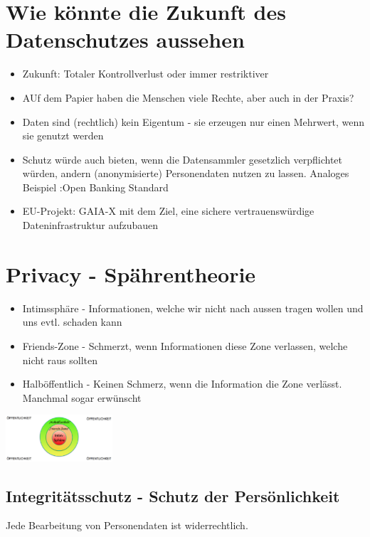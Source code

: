 \documentclass{report}
\newenvironment{Figure}
	{\par\medskip\noindent\minipage{\linewidth}}
	{\endminipage\par\medskip}
\theoremstyle{definition}
\theoremstyle{example}
\begin{document}
\section{Wie könnte die Zukunft des Datenschutzes aussehen}
\begin{itemize}
   \item Zukunft: Totaler Kontrollverlust oder immer restriktiver
   \item AUf dem Papier haben die Menschen viele Rechte, aber auch in der Praxis?
   \item Daten sind (rechtlich) kein Eigentum - sie erzeugen nur einen Mehrwert, wenn sie genutzt werden
   \item Schutz würde auch bieten, wenn die Datensammler gesetzlich verpflichtet würden, andern (anonymisierte) Personendaten nutzen zu lassen. Analoges Beispiel :Open Banking Standard
   \item EU-Projekt: GAIA-X mit dem Ziel, eine sichere vertrauenswürdige Dateninfrastruktur aufzubauen
\end{itemize}

\section{Privacy - Spährentheorie}

\begin{itemize}
   \item Intimssphäre - Informationen, welche wir nicht nach aussen tragen wollen und uns evtl. schaden kann
   \item Friends-Zone - Schmerzt, wenn Informationen diese Zone verlassen, welche nicht raus sollten
   \item Halböffentlich - Keinen Schmerz, wenn die Information die Zone verlässt. Manchmal sogar erwünscht
\end{itemize}

\begin{Figure}
   \centering
    \includegraphics[width=150px]{img/Sphaerentheorie.png}
        \label{fig:Abbildung der Sphaerentheorie}
\end{Figure}

\subsection{Integritätsschutz - Schutz der Persönlichkeit}
Jede Bearbeitung von Personendaten ist widerrechtlich. \\
\end{document}
